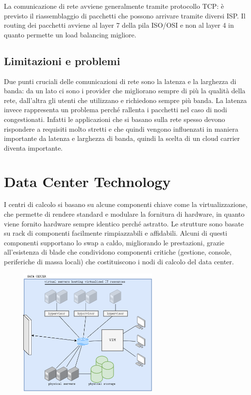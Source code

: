 La comunicazione di rete avviene generalmente tramite protocollo TCP: è previsto il riassemblaggio di pacchetti che possono arrivare tramite diversi ISP. Il routing dei pacchetti avviene al layer 7 della pila ISO/OSI e non al layer 4 in quanto permette un load balancing migliore.

\subsection{Limitazioni e problemi}
Due punti cruciali delle comunicazioni di rete sono la latenza e la larghezza di banda: da un lato ci sono i provider che migliorano sempre di più la qualità della rete, dall'altra gli utenti che utilizzano e richiedono sempre più banda. La latenza invece rappresenta un problema perché rallenta i pacchetti nel caso di nodi congestionati. Infatti le applicazioni che si basano sulla rete spesso devono rispondere a requisiti molto stretti e che quindi vengono influenzati in maniera importante da latenza e larghezza di banda, quindi la scelta di un cloud carrier diventa importante.

\section{Data Center Technology}
I centri di calcolo si basano su alcune componenti chiave come la virtualizzazione, che permette di rendere standard e modulare la fornitura di hardware, in quanto viene fornito hardware sempre identico perché astratto. Le strutture sono basate su rack di componenti facilmente rimpiazzabili e affidabili. Alcuni di questi componenti supportano lo swap a caldo, migliorando le prestazioni, grazie all'esistenza di blade che condividono componenti critiche (gestione, console, periferiche di massa locali) che costituiscono i nodi di calcolo del data center. 

\begin{figure}[ht]
    \centering
    \includegraphics[width=7cm]{./Images/cap3/3.9.png}
\end{figure}

